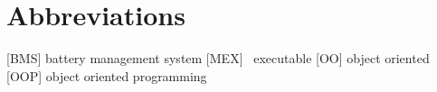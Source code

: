 \section*{Abbreviations}
\thispagestyle{plain}
\begin{acronym}
	[BMS] battery management system
	[MEX] \matlab\ executable
	[OO] object oriented
	[OOP] object oriented programming
	
\end{acronym}
